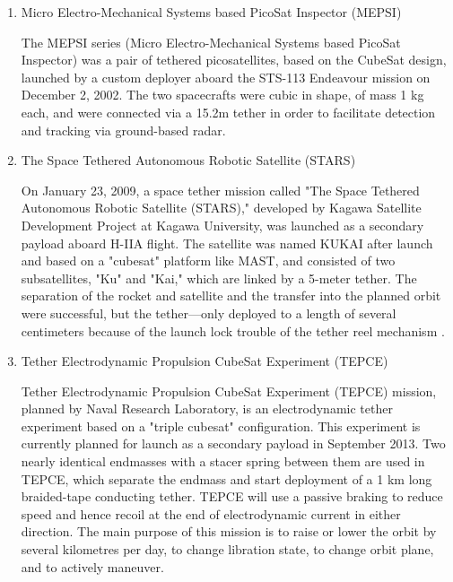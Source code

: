 \begin{enumerate}
\item Micro Electro-Mechanical Systems based PicoSat Inspector (MEPSI)

The MEPSI series (Micro Electro-Mechanical Systems based PicoSat Inspector) was a pair of tethered picosatellites, based on the CubeSat design, launched by a custom deployer aboard the STS-113 Endeavour mission on December 2, 2002. The two spacecrafts were cubic in shape, of mass 1 kg each, and were connected via a 15.2m tether in order to facilitate detection and tracking via ground-based radar.


\item The Space Tethered Autonomous Robotic Satellite (STARS)

On January 23, 2009, a space tether mission called "The Space Tethered Autonomous Robotic Satellite (STARS)," developed by Kagawa Satellite Development Project at Kagawa University, was launched as a secondary payload aboard H-IIA flight. The satellite was named KUKAI after launch and based on a "cubesat" platform like MAST, and consisted of two subsatellites, "Ku" and "Kai," which are linked by a 5-meter tether. The separation of the rocket and satellite and the transfer into the planned orbit were successful, but the tether—only deployed to a length of several centimeters because of the launch lock trouble of the tether reel mechanism .

\item Tether Electrodynamic Propulsion CubeSat Experiment (TEPCE)

Tether Electrodynamic Propulsion CubeSat Experiment (TEPCE) mission, planned by Naval Research Laboratory, is an electrodynamic tether experiment based on a "triple cubesat" configuration. This experiment is currently planned for launch as a secondary payload in September 2013. Two nearly identical endmasses with a stacer spring between them are used in TEPCE, which separate the endmass and start deployment of a 1 km long braided-tape conducting tether. TEPCE will use a passive braking to reduce speed and hence recoil at the end of electrodynamic current in either direction.
The main purpose of this mission is to raise or lower the orbit by several kilometres per day, to change libration state, to change orbit plane, and to actively maneuver.
\end{enumerate}

